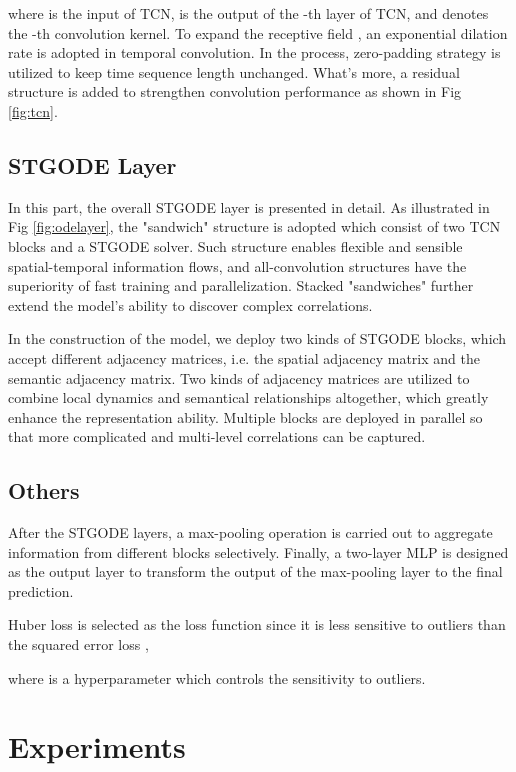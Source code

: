 \documentclass[sigconf]{acmart}
\theoremstyle{definition}
\begin{document}
where  is the input of TCN,  is the output of the -th layer of TCN,  and  denotes the -th convolution kernel. To expand the receptive field , an exponential dilation rate  is adopted in temporal convolution. In the process, zero-padding strategy is utilized to keep time sequence length unchanged. What's more, a residual structure \cite{he2016deep} is added to strengthen convolution performance as shown in Fig \ref{fig:tcn}.

\subsection{STGODE Layer}
In this part, the overall STGODE layer is presented in detail. As illustrated in Fig \ref{fig:odelayer}, the "sandwich" structure is adopted which consist of two TCN blocks and a STGODE solver. Such structure enables flexible and sensible spatial-temporal information flows, and all-convolution structures have the superiority of fast training and parallelization. Stacked "sandwiches" further extend the model's ability to discover complex correlations.

In the construction of the model, we deploy two kinds of STGODE blocks, which accept different adjacency matrices, i.e. the spatial adjacency matrix and the semantic adjacency matrix. Two kinds of adjacency matrices are utilized to combine local dynamics and semantical relationships altogether, which greatly enhance the representation ability. Multiple blocks are deployed in parallel so that more complicated and multi-level correlations can be captured.

\subsection{Others}
After the STGODE layers, a max-pooling operation is carried out to aggregate information from different blocks selectively. Finally, a two-layer MLP is designed as the output layer to transform the output of the max-pooling layer to the final prediction.

Huber loss is selected as the loss function since it is less sensitive to outliers than the squared error loss \cite{huber1992robust},

where  is a hyperparameter which controls the sensitivity to outliers.

\section{Experiments}
\end{document}
